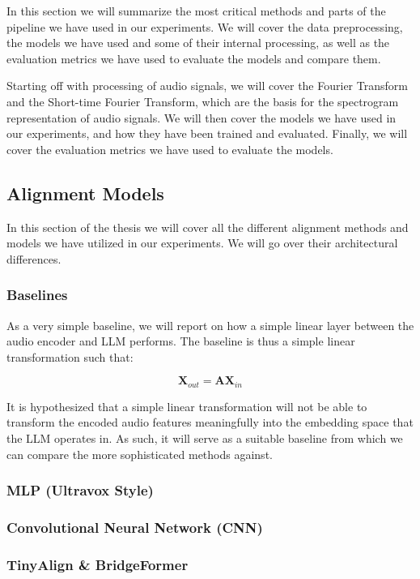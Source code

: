 In this section we will summarize the most critical methods and parts of the pipeline we have used in our experiments. We will cover the data preprocessing, the models we have used and some of their internal processing, as well as the evaluation metrics we have used to evaluate the models and compare them.

Starting off with processing of audio signals, we will cover the Fourier Transform and the Short-time Fourier Transform, which are the basis for the spectrogram representation of audio signals. We will then cover the models we have used in our experiments, and how they have been trained and evaluated. Finally, we will cover the evaluation metrics we have used to evaluate the models.

\subsection{Alignment Models}

In this section of the thesis we will cover all the different alignment methods and models we have utilized in our experiments. We will go over their architectural differences.

\subsubsection{Baselines}

As a very simple baseline, we will report on how a simple linear layer between the audio encoder and LLM performs. The baseline is thus a simple linear transformation such that:

$$ \mathbf{X}_{out} = \mathbf{A}\mathbf{X}_{in} $$

It is hypothesized that a simple linear transformation will not be able to transform the encoded audio features meaningfully into the embedding space that the LLM operates in. As such, it will serve as a suitable baseline from which we can compare the more sophisticated methods against.

\subsubsection{MLP (Ultravox Style)}

\subsubsection{Convolutional Neural Network (CNN)}

\subsubsection{TinyAlign \& BridgeFormer}

